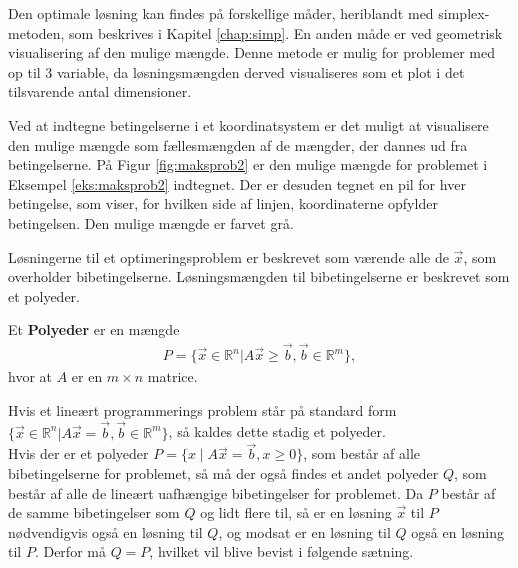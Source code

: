 Den optimale løsning kan findes på forskellige måder, heriblandt med simplex-metoden, som beskrives i Kapitel \ref{chap:simp}. En anden måde er ved geometrisk visualisering af den mulige mængde. Denne metode er mulig for problemer med op til 3 variable, da løsningsmængden derved visualiseres som et plot i det tilsvarende antal dimensioner. 

\begin{eks}
Ved at indtegne betingelserne i et koordinatsystem er det muligt at visualisere den mulige mængde som fællesmængden af de mængder, der dannes ud fra betingelserne. På Figur \ref{fig:maksprob2} er den mulige mængde for problemet i Eksempel \ref{eks:maksprob2} indtegnet. Der er desuden tegnet en pil for hver betingelse, som viser, for hvilken side af linjen, koordinaterne opfylder betingelsen. Den mulige mængde er farvet grå.

\begin{center}
	
	\label{fig:maksprob2}
\end{center}
\end{eks}

Løsningerne til et optimeringsproblem er beskrevet som værende alle de $\vec{x}$, som overholder bibetingelserne. Løsningsmængden til bibetingelserne er beskrevet som et polyeder.
\begin{defn} [Polyeder]
Et \textbf{Polyeder} er en mængde 
\begin{align*}
 P =\{ \vec{x} \in \mathds{R}^n | A \vec{x} \geq \vec{b}, \vec{b}\in \mathds{R}^m\},
\end{align*}
hvor at $A$ er en $m \times n$ matrice.
\end{defn}
Hvis et lineært programmerings problem står på standard form $\{ \vec{x} \in \mathds{R}^n | A \vec{x} = \vec{b}, \vec{b}\in \mathds{R}^m\}$, så kaldes dette stadig et polyeder.\\

Hvis der er et polyeder $P=\{x\mid A\vec{x}=\vec{b},x\geq 0\}$, som består af alle bibetingelserne for problemet, så må der også findes et andet polyeder $Q$, som består af alle de lineært uafhængige bibetingelser for problemet. Da $P$ består af de samme bibetingelser som $Q$ og lidt flere til, så er en løsning $\vec{x}$ til $P$ nødvendigvis også en løsning til $Q$, og modsat er en løsning til $Q$ også en løsning til $P$. Derfor må $Q=P$, hvilket vil blive bevist i følgende sætning.

